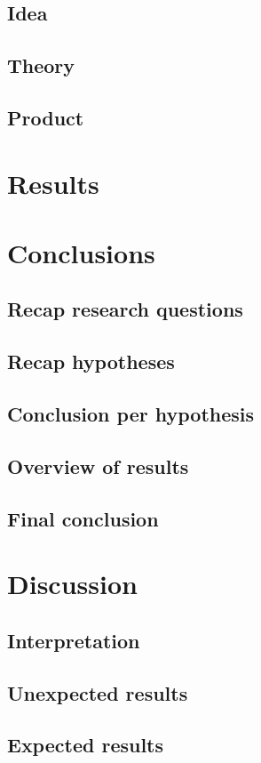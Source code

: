 \documentclass{article}
\begin{document}
 \subsection{Idea}
 \subsection{Theory}
 \subsection{Product}
 
 \section{Results}
 
 \section{Conclusions}
 \subsection{Recap research questions}
 \subsection{Recap hypotheses}
 \subsection{Conclusion per hypothesis}
 \subsection{Overview of results}
 \subsection{Final conclusion}
 
 \section{Discussion}
 \subsection{Interpretation}
 \subsection{Unexpected results}
 \subsection{Expected results}
\end{document}
